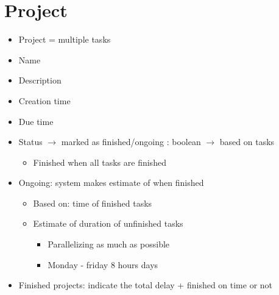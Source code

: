 \documentclass[11pt]{article}
\begin{document}
\section{Project}
\begin{itemize}
\item Project = multiple tasks
\item Name
\item Description
\item Creation time
\item Due time
\item Status $\rightarrow$  marked as finished/ongoing : boolean $\rightarrow$  based on tasks
\begin{itemize}
\item Finished when all tasks are finished
\end{itemize}
\item Ongoing: system makes estimate of when finished
\begin{itemize}
\item Based on: time of finished tasks
\item Estimate of duration of unfinished tasks
\begin{itemize}
\item Parallelizing as much as possible
\item Monday - friday 8 hours days
\end{itemize}

\end{itemize}
\item Finished projects: indicate the total delay + finished on time or not

\end{itemize}
\end{document}
